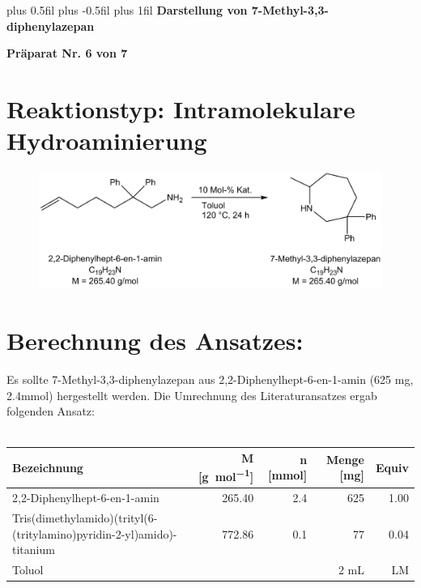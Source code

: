 \documentclass[12pt]{article}
\begin{document}
\begin{onehalfspace}

\begingroup
\leftskip=0cm plus 0.5fil \rightskip=0cm plus -0.5fil
\parfillskip=0cm plus 1fil
 \textbf{\large Darstellung von 7-Methyl-3,3-diphenylazepan}\par
\endgroup

\begin{center}
 \textbf{Präparat Nr. 6 von 7}
\end{center}
\section{Reaktionstyp: \textnormal{Intramolekulare Hydroaminierung} }
\begin{figure}[ht]
\centering
\includegraphics[scale=0.3]{reaktion.png}
\end{figure}

\section{Berechnung des Ansatzes: }
Es sollte 7-Methyl-3,3-diphenylazepan aus 2,2-Diphenylhept-6-en-1-amin (625 \si{\milli\gram}, 2.4\si{\milli\mol}) hergestellt werden. Die Umrechnung des Literaturansatzes ergab folgenden Ansatz:\cite{vor}\\\\
\noindent
\begin{tabularx}{\textwidth}{Xrrrr}
\toprule
\textbf{ Bezeichnung }&\textbf{M [\si{\gram\per\mol}]} & \textbf{ n [\si{\milli\mol}]} & \textbf{Menge [\si{\milli\gram}]}& \textbf{Equiv}\\
\midrule
 2,2-Diphenylhept-6-en-1-amin                    & 265.40   & 2.4  & 625  & 1.00 \\
 Tris(dimethylamido)(trityl(6-(tritylamino)pyridin-2-yl)amido)-titanium    & 772.86   & 0.1  & 77   & 0.04 \\
 Toluol &   &  & 2 \si{\milli\liter} & LM \\
\bottomrule
\end{tabularx}

\end{onehalfspace}
\end{document}
